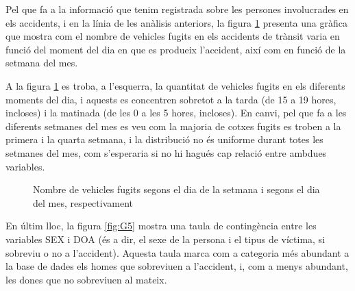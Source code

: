 \documentclass[12pt,longbibliography]{article}
\theoremstyle{definition}
\theoremstyle{remark}
\begin{document}
Pel que fa a la informació que tenim registrada sobre les persones involucrades en els accidents, i en la línia de les anàlisis anteriors, la figura  \ref{fig:G4} presenta una gràfica que mostra com el nombre de vehicles fugits en els accidents de trànsit varia en funció del moment del dia en que es produeix l'accident, així com en funció de la setmana del mes. 

A la figura \ref{fig:G4} es troba, a l'esquerra, la quantitat de vehicles fugits en els diferents moments del dia, i aquests es concentren sobretot a la tarda (de 15 a 19 hores, incloses) i la matinada (de les 0 a les 5 hores, incloses). En canvi, pel que fa a les diferents setmanes del mes es veu com la majoria de cotxes fugits es troben a la primera i la quarta setmana, i la distribució no és uniforme durant totes les setmanes del mes, com s'esperaria si no hi hagués cap relació entre ambdues variables.

\begin{figure}[h!]
\par
{}%
\hfill
{}%
\par

\caption{Nombre de vehicles fugits segons el dia de la setmana i segons el dia del mes, respectivament}
\label{fig:G4}
\end{figure}


En últim lloc, la figura \ref{fig:G5} mostra una taula de contingència entre les variables SEX i DOA (és a dir, el sexe de la persona i el tipus de víctima, si sobreviu o no a l'accident). Aquesta taula marca com a categoria més abundant a la base de dades els homes que sobreviuen a l'accident, i, com a menys abundant, les dones que no sobreviuen al mateix. 
\end{document}
